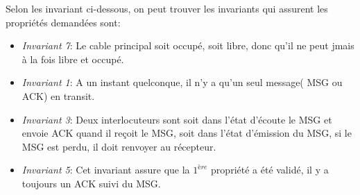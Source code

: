 \documentclass[a4paper,11pt]{report}
\begin{document}
	
	Selon les invariant ci-dessous, on peut trouver les invariants qui assurent les propriétés demandées sont:
	
		\begin{itemize}
		\item \textit{Invariant 7}: Le cable principal soit occupé, soit libre, donc qu'il ne peut jmais à la fois libre et occupé.
		\item \textit{Invariant 1}: A un instant quelconque, il n'y a qu'un seul message( MSG ou ACK) en transit.
		\item \textit{Invariant 3}: Deux interlocuteurs sont soit dans l'état d'écoute le MSG et envoie ACK quand il reçoit le MSG, soit dans l'état d'émission du MSG, si le MSG est perdu, il doit renvoyer au récepteur.
		\item \textit{Invariant 5}: Cet invariant assure que la $1^{ère}$ propriété a été validé, il y a toujours un ACK suivi du MSG.
	\end{itemize}
	
	
\end{document}

